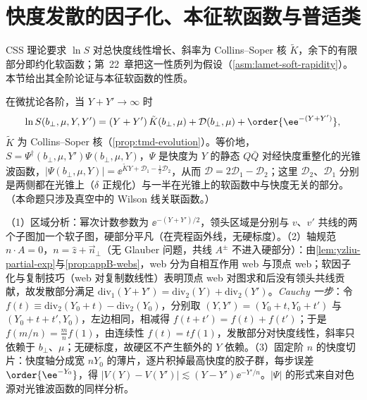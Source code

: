 \section{快度发散的因子化、本征软函数与普适类}\label{sec:yzliu-rapidity}

CSS 理论要求 $\ln S$ 对总快度线性增长、斜率为 Collins--Soper 核 $\tilde K$，余下的有限部分即约化软函数；第~22~章把这一性质列为假设（\cref{asm:lamet-soft-rapidity}）。本节给出其全阶论证与本征软函数的性质。

\begin{proposition}\label{prop:yzliu-rapidity-linear}
在微扰论各阶，当 $Y+Y'\to\infty$ 时
\begin{equation}\label{eq:yzliu-rapidity-linear}
\ln S(b_\perp,\mu,Y,Y')=(Y+Y')\,\tilde K(b_\perp,\mu)+\mathcal D(b_\perp,\mu)+\order{\ee^{-(Y+Y')}} ,
\end{equation}
$\tilde K$ 为 Collins--Soper 核（\cref{prop:tmd-evolution}）。等价地，$S=\Psi^\dagger(b_\perp,\mu,Y')\Psi(b_\perp,\mu,Y)$，$\Psi$ 是快度为 $Y$ 的静态 $Q\bar Q$ 对经快度重整化的光锥波函数\cite[式~(116)]{Liu:2022nnk}，$|\Psi(b_\perp,\mu,Y)|=\ee^{\tilde KY+\mathcal D_1-\frac12\mathcal D_2}$，从而 $\mathcal D=2\mathcal D_1-\mathcal D_2$；这里 $\mathcal D_2$、$\mathcal D_1$ 分别是两侧都在光锥上（$\delta$ 正规化）与一半在光锥上的软函数中与快度无关的部分。（本命题只涉及真空中的 Wilson 线关联函数。）
\end{proposition}

\begin{proofsketch}
（1）区域分析\cite[第~4.4~节]{Liu:2022nnk}：幂次计数参数为 $\ee^{-(Y+Y')/2}$，领头区域是分别与 $v$、$v'$ 共线的两个子图加一个软子图，硬部分平凡（在壳程函外线，无硬标度）。（2）轴规范 $n\cdot A=0$，$n=\hat z+\vec n_\perp$（无 Glauber 问题，共线 $A^\pm$ 不进入硬部分）\cite[附录~E]{Liu:2022nnk}：由\cref{lem:yzliu-partial-exp}与\cref{prop:appB-webs}，web 分为自相互作用 web 与顶点 web；软因子化与复制技巧（web 对复制数线性）表明顶点 web 对图求和后没有领头共线贡献，故发散部分满足 $\mathrm{div}_1(Y+Y')=\mathrm{div}_2(Y)+\mathrm{div}_2(Y')$。\emph{Cauchy 一步}：令 $f(t)\equiv\mathrm{div}_2(Y_0+t)-\mathrm{div}_2(Y_0)$，分别取 $(Y,Y')=(Y_0+t,Y_0+t')$ 与 $(Y_0+t+t',Y_0)$，左边相同，相减得 $f(t+t')=f(t)+f(t')$；于是 $f(m/n)=\frac mnf(1)$，由连续性 $f(t)=tf(1)$，发散部分对快度线性，斜率只依赖于 $b_\perp$、$\mu$；无硬标度，故硬区不产生额外的 $Y$ 依赖。（3）固定阶 $n$ 的快度切片：快度轴分成宽 $nY_0$ 的薄片，逐片积掉最高快度的胶子群，每步误差 $\order{\ee^{-Y_0}}$，得 $|V(Y)-V(Y')|\lesssim(Y-Y')\ee^{-Y'/n}$\cite[式~(E.1)--(E.13)]{Liu:2022nnk}。$|\Psi|$ 的形式来自对色源对光锥波函数的同样分析\cite[式~(116)--(122)]{Liu:2022nnk}。
\end{proofsketch}

